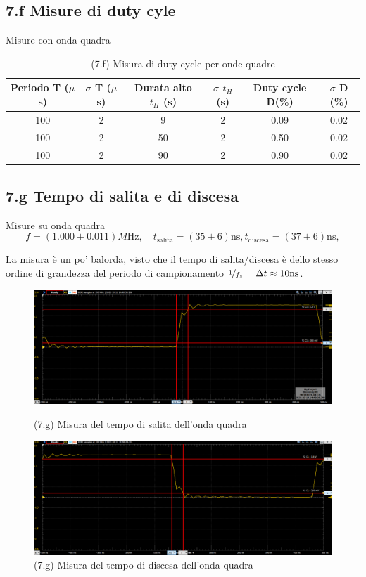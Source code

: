 \documentclass[10pt,a4paper]{article}
\begin{document}
\subsection*{7.f Misure di duty cyle}
Misure con onda quadra
\begin{table}[h]
\centering
\begin{tabular}{|c|c|c|c|c|c|}
\hline 
Periodo T ($\mu$ s)& $\sigma$ T ($\mu$ s) & Durata alto $t_H$ (s) & $\sigma$ $t_H$ (s)
& Duty cycle D(\%) & $\sigma$ D (\%) \\
\hline 
100 & 2 & 9 & 2 & 0.09 & 0.02 \\
100 & 2 & 50 & 2 & 0.50 & 0.02 \\
100 & 2 & 90 & 2 & 0.90 & 0.02 \\
\hline 
\end{tabular} 
\caption{(7.f) Misura di duty cycle per onde quadre }
\end{table}


\subsection*{7.g Tempo di salita e di discesa}
Misure su onda quadra
\[
f = (1.000 \pm 0.011) \si{M\Hz}, \quad
t_\mathrm{salita} = (35 \pm 6) \mathrm{ns},
t_\mathrm{discesa} = (37 \pm 6) \mathrm{ns},
\]

La misura è un po' balorda, visto che il tempo di salita/discesa è dello
stesso ordine di grandezza del periodo di campionamento $\nicefrac{1}{f_s} = \Delta t \approx 10 \si{\ns}$.
\begin{figure}[htb]
\centering
\includegraphics[scale=0.4]{tempo_salita}
\caption{(7.g) Misura del tempo di salita dell'onda quadra }

\includegraphics[scale=0.4]{tempo_discesa}
\caption{(7.g) Misura del tempo di discesa dell'onda quadra }
\end{figure}
\end{document}
